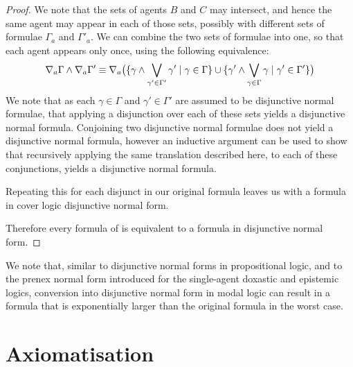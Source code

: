 \begin{proof}
We note that the sets of agents $B$ and $C$ may intersect, and hence the same
agent may appear in each of those sets, possibly with different sets of formulae
$\Gamma_a$ and $\Gamma'_a$. We can combine the two sets of formulae into one, so
that each agent appears only once, using the following equivalence:
$$
\nabla_a \Gamma \land \nabla_a \Gamma' \equiv 
\nabla_a \big( 
\{ \gamma \land \bigvee_{\gamma' \in \Gamma'} \gamma' \mid \gamma \in \Gamma \}
\cup
\{ \gamma' \land \bigvee_{\gamma \in \Gamma} \gamma \mid \gamma' \in \Gamma' \}
\big)
$$
We note that as each $\gamma \in \Gamma$ and $\gamma' \in \Gamma'$ are assumed
to be disjunctive normal formulae, that applying a disjunction over each of
these sets yields a disjunctive normal formula. Conjoining two disjunctive
normal formulae does not yield a disjunctive normal formula, however an
inductive argument can be used to show that recursively applying the same
translation described here, to each of these conjunctions, yields a disjunctive
normal formula.

Repeating this for each disjunct in our original formula leaves us with a
formula in cover logic disjunctive normal form.

Therefore every formula of \lang{} is equivalent to a formula in disjunctive
normal form.
\end{proof}

We note that, similar to disjunctive normal forms in propositional logic, and to
the prenex normal form introduced for the single-agent doxastic and epistemic
logics, conversion into disjunctive normal form in modal logic can result
in a formula that is exponentially larger than the original formula in the worst
case.

\pagebreak
\section{Axiomatisation}

